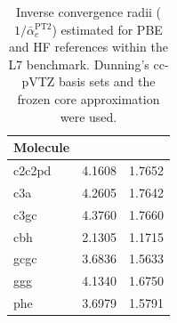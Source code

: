 \documentclass[journal=jctcce,manuscript=article]{achemso}
\begin{document}
\begin{spacing}{1}
\begin{longtable}{lRR}
  \caption{Inverse convergence radii
    ($1/\bar{\alpha}^{\text{PT2}}_c$) estimated for PBE and HF references within the
    L7 benchmark.\cite{doi:10.1021/ct400036b} Dunning's cc-pVTZ basis
    sets and the frozen core approximation were used.}\\
  \hline
  Molecule &  &  \\
  \hline
  c2c2pd & 4.1608 & 1.7652 \\
  c3a & 4.2605 & 1.7642 \\
  c3gc & 4.3760 & 1.7660 \\
  cbh & 2.1305 & 1.1715 \\
  gcgc & 3.6836 & 1.5633 \\
  ggg & 4.1340 & 1.6750 \\
  phe & 3.6979 & 1.5791 \\
\end{longtable}


\end{spacing}
\end{document}
